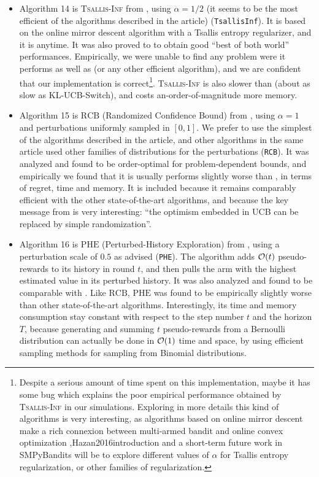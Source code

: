 \begin{itemize}
    \item Algorithm 14 is
    \textsc{Tsallis-Inf} from \cite{Zimmert2018}, using $\alpha=1/2$ (it seems to be the most efficient of the algorithms described in the article) (\texttt{TsallisInf}).
    It is based on the online mirror descent algorithm with a Tsallis entropy regularizer, and it is anytime.
    It was also proved to to obtain good ``best of both world'' performances.
    Empirically, we were unable to find any problem were it performs as well as \UCB{} (or any other efficient algorithm), and we are confident that our implementation is correct\footnote{Despite a serious amount of time spent on this implementation, maybe it has some bug which explains the poor empirical performance obtained by \textsc{Tsallis-Inf} in our simulations. Exploring in more details this kind of algorithms is very interesting, as algorithms based on online mirror descent make a rich connexion between multi-armed bandit and online convex optimization \cite{Hazan2016introduction},Hazan2016introduction and a short-term future work in SMPyBandits will be to explore different values of $\alpha$ for Tsallis entropy regularization, or other families of regularization.}.
    \textsc{Tsallis-Inf} is also slower than \UCB{} (about as slow as KL-UCB-Switch), and costs an-order-of-magnitude more memory.

    \item Algorithm 15 is
    $\mathrm{RCB}$ (Randomized Confidence Bound) from \cite{KimTewari2019}, using $\alpha=1$ and perturbations uniformly sampled in $[0,1]$. We prefer to use the simplest of the algorithms described in the article, and other algorithms in the same article used other families of distributions for the perturbations (\texttt{RCB}).
    It was analyzed and found to be order-optimal for problem-dependent bounds, and empirically we found that it is usually performs slightly worse than \UCB, in terms of regret, time and memory.
    It is included because it remains comparably efficient with the other state-of-the-art algorithms, and because the key message from \cite{KimTewari2019} is very interesting:
    ``the optimism embedded in UCB can be replaced by simple randomization''.

    \item Algorithm 16 is
    $\mathrm{PHE}$ (Perturbed-History Exploration) from \cite{KvetonSzepesvari2019}, using a perturbation scale of $0.5$ as advised (\texttt{PHE}).
    The algorithm adds $\mathcal{O}(t)$ \iid{} pseudo-rewards to its history in round $t$, and then pulls the arm with the highest estimated value in its perturbed history.
    It was also analyzed and found to be comparable with \UCB.
    Like $\mathrm{RCB}$, $\mathrm{PHE}$ was found to be empirically slightly worse than other state-of-the-art algorithms.
    Interestingly, its time and memory consumption stay constant with respect to the step number $t$ and the horizon $T$, because generating and summing $t$ pseudo-rewards from a Bernoulli distribution can actually be done in $\mathcal{O}(1)$ time and space, by using efficient sampling methods for sampling from Binomial distributions.
\end{itemize}

